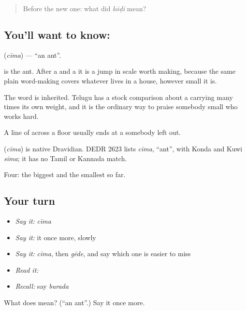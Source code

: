 \begin{quote}
Before the new one: what did \emph{kōḍi} mean?
\end{quote}

\subsection*{You'll want to know: }
\textbf{} (\emph{cīma}) — \textquotedblleft{}an ant\textquotedblright{}.

 is the ant. After a  and a  it is a jump in scale worth making, because the same plain word-making covers whatever lives in a house, however small it is.

The word is inherited. Telugu has a stock comparison about a  carrying many times its own weight, and it is the ordinary way to praise somebody small who works hard.

A line of  across a floor usually ends at a  somebody left out.

\begin{cousinweb}
\textbf{} (\emph{cīma}) is native Dravidian. DEDR 2623 lists \emph{cīma}, \textquotedblleft{}ant\textquotedblright{}, with Konda and Kuwi \emph{sīma}; it has no Tamil or Kannada match.
\end{cousinweb}

\begin{grammarlens}[title={What you've built}]
Four: the biggest and the smallest so far.
\end{grammarlens}

\subsection*{Your turn}
\begin{itemize}
\raggedright
  \item \emph{Say it:} \emph{cīma}
  \item \emph{Say it:} it once more, slowly
  \item \emph{Say it:} \emph{cīma}, then \emph{gēde}, and say which one is easier to miss
  \item \emph{Read it:} \textbf{}
  \item \emph{Recall:} say \emph{burada}
\end{itemize}

\begin{tcolorbox}[breakable,colback=teal!4,colframe=teal!35!black,title={Before you move on}]
What does  mean? (\textquotedblleft{}an ant\textquotedblright{}.) Say it once more.
\end{tcolorbox}
